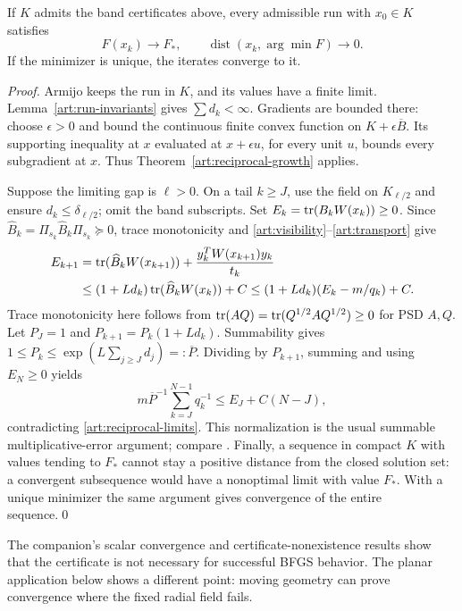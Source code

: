 \begin{theorem}\label{art:certificate}
If $K$ admits the band certificates above, every admissible run with $x_0\in K$
satisfies
\[
 F(x_k)\to F_*,\qquad
 \operatorname{dist}(x_k,\arg\min F)\to0.
\]
If the minimizer is unique, the iterates converge to it.
\end{theorem}
\begin{proof}
Armijo keeps the run in $K$, and its values have a finite limit.
Lemma~\ref{art:run-invariants} gives $\sum d_k<\infty$.
Gradients are bounded there: choose $\epsilon>0$ and bound the continuous
finite convex function on $K+\epsilon\overline B$. Its supporting inequality
at $x$ evaluated at $x+\epsilon u$, for every unit $u$, bounds every
subgradient at $x$. Thus Theorem~\ref{art:reciprocal-growth} applies.

Suppose the limiting gap is $\ell>0$. On a tail $k\ge J$, use the field
on $K_{\ell/2}$ and ensure $d_k\le\delta_{\ell/2}$; omit the band subscripts.
Set $E_k=\operatorname{tr}(B_kW(x_k))\ge0$. Since
$\widehat B_k=\Pi_{s_k}\widehat B_k\Pi_{s_k}\succeq0$, trace monotonicity and
\eqref{art:visibility}--\eqref{art:transport} give
\begin{align*}
 E_{k+1}
 &=\operatorname{tr}(\widehat B_kW(x_{k+1}))+
       \frac{y_k^TW(x_{k+1})y_k}{t_k}\\
 &\le(1+Ld_k)\operatorname{tr}(\widehat B_kW(x_k))+C
 \le(1+Ld_k)(E_k-m/q_k)+C.
\end{align*}
Trace monotonicity here follows from
$\operatorname{tr}(AQ)=\operatorname{tr}(Q^{1/2}AQ^{1/2})\ge0$ for PSD $A,Q$.
Let $P_J=1$ and $P_{k+1}=P_k(1+Ld_k)$. Summability gives
$1\le P_k\le\exp(L\sum_{j\ge J}d_j)=:\overline P$.
Dividing by $P_{k+1}$, summing and using $E_N\ge0$ yields
\[
 m\overline P^{-1}\sum_{k=J}^{N-1}q_k^{-1}
       \le E_J+C(N-J),
\]
contradicting \eqref{art:reciprocal-limits}. This normalization is the usual
summable multiplicative-error argument; compare \cite[Lemmas~2.2--2.3]{FND_CV13}.
Finally, a sequence in compact $K$ with values tending to $F_*$ cannot stay
a positive distance from the closed solution set: a convergent subsequence
would have a nonoptimal limit with value $F_*$. With a unique minimizer the
same argument gives convergence of the entire sequence.\qed
\end{proof}

The companion's scalar convergence and certificate-nonexistence results
show that the certificate is not necessary for successful BFGS behavior.
The planar application below shows a different point: moving geometry can
prove convergence where the fixed radial field fails.
